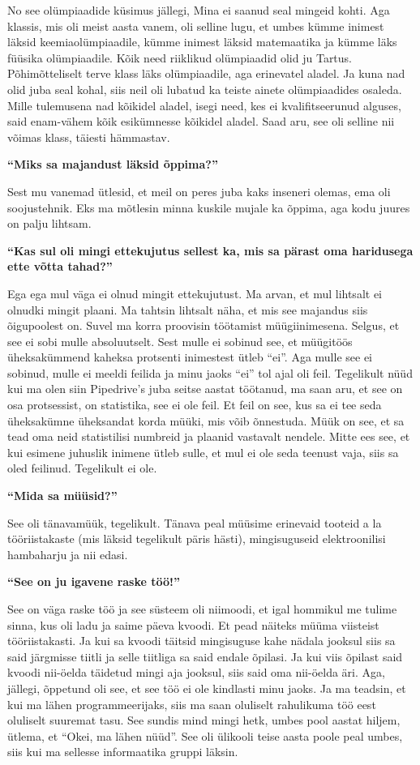 No see olümpiaadide küsimus jällegi, Mina ei saanud seal mingeid kohti. Aga 
klassis, mis oli meist aasta vanem,
 oli selline lugu, et umbes kümme inimest läksid keemiaolümpiaadile, kümme 
inimest läksid matemaatika ja kümme läks füüsika olümpiaadile. Kõik need 
riiklikud olümpiaadid olid ju Tartus. Põhimõtteliselt terve klass läks 
olümpiaadile, aga erinevatel aladel. Ja kuna nad olid juba seal kohal, siis 
neil oli lubatud  ka teiste ainete olümpiaadides osaleda. Mille tulemusena nad 
kõikidel aladel, isegi need, kes ei kvalifitseerunud alguses, said enam-vähem 
kõik esikümnesse kõikidel aladel. Saad aru, see oli selline nii võimas klass, 
täiesti hämmastav.

\textbf{\enquote{Miks sa majandust läksid õppima?}}

Sest mu vanemad ütlesid, et meil on peres juba kaks inseneri olemas, ema oli 
soojustehnik. Eks ma mõtlesin minna kuskile mujale ka õppima, aga  kodu juures 
on palju lihtsam. 

\textbf{\enquote{Kas sul oli mingi ettekujutus sellest ka, mis sa pärast oma 
haridusega ette võtta tahad?}}

Ega ega mul väga ei olnud mingit ettekujutust. Ma arvan, et mul lihtsalt ei 
olnudki mingit plaani. Ma tahtsin lihtsalt näha, et mis  see majandus siis 
õigupoolest on. Suvel ma korra proovisin töötamist müügiinimesena. Selgus, et 
see ei sobi mulle absoluutselt. Sest mulle ei sobinud see, et müügitöös 
üheksakümmend kaheksa protsenti inimestest ütleb \enquote{ei}. Aga mulle see ei 
sobinud, mulle ei meeldi feilida ja minu jaoks \enquote{ei} tol ajal oli feil. 
Tegelikult nüüd kui ma olen siin Pipedrive's juba seitse 
aastat töötanud, ma saan aru, et see on osa protsessist, on statistika, see ei 
ole feil. Et feil on see, kus sa ei tee seda üheksakümne üheksandat korda
müüki, mis võib õnnestuda. Müük on see, et sa tead oma neid statistilisi 
numbreid ja plaanid vastavalt nendele. Mitte ees see, et kui esimene juhuslik 
inimene ütleb sulle, et mul ei ole seda teenust vaja, siis sa oled feilinud. 
Tegelikult ei ole.

\textbf{\enquote{Mida sa müüsid?}}

See oli tänavamüük, tegelikult. Tänava peal müüsime erinevaid tooteid a la 
tööriistakaste (mis läksid tegelikult päris hästi), mingisuguseid 
elektroonilisi hambaharju ja nii edasi.

\textbf{\enquote{See on ju igavene raske töö!}}

See on väga raske töö ja  see süsteem oli niimoodi, et igal hommikul me tulime 
sinna, kus oli ladu ja saime päeva kvoodi. Et pead näiteks müüma viisteist 
tööriistakasti. Ja kui sa kvoodi täitsid mingisuguse kahe nädala jooksul siis 
sa said järgmisse tiitli ja selle tiitliga sa said endale õpilasi. Ja kui viis 
õpilast said kvoodi nii-öelda täidetud mingi aja jooksul, siis said oma 
nii-öelda äri. Aga, jällegi, õppetund oli see, et see töö ei ole kindlasti minu 
jaoks. Ja ma teadsin, et kui ma lähen programmeerijaks, siis ma saan oluliselt 
rahulikuma töö eest oluliselt suuremat tasu. See sundis mind mingi hetk, umbes 
pool aastat hiljem, ütlema, et \enquote{Okei, ma lähen nüüd}. See oli ülikooli 
teise aasta poole peal umbes, siis kui ma sellesse informaatika gruppi läksin.

